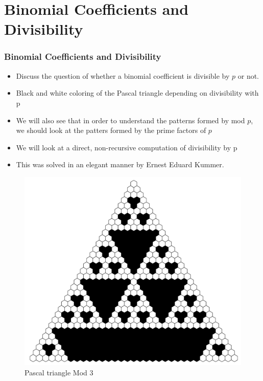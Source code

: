 \documentclass{beamer}
\begin{document}
\section{Binomial Coefficients and Divisibility}
\begin{frame}
    \frametitle{Binomial Coefficients and Divisibility}
    \begin{itemize}
        \item Discuss the question of whether a binomial coefficient is divisible by $p$ or not. 
        \item Black and white coloring of the Pascal triangle depending on divisibility with p
        \item We will also see that in order to understand the patterns formed by mod $p$, we should look at the patters formed by the prime factors of $p$ 
        \item We will look at a direct, non-recursive computation of divisibility by p
        \item This was solved in an elegant manner by Ernest Eduard Kummer.
    \end{itemize}
\end{frame}

\begin{frame}
    \begin{figure}
        \includegraphics[scale=0.37]{PascalMod3.pdf}
        \caption{Pascal triangle Mod 3}
    \end{figure}
\end{frame}
\end{document}
